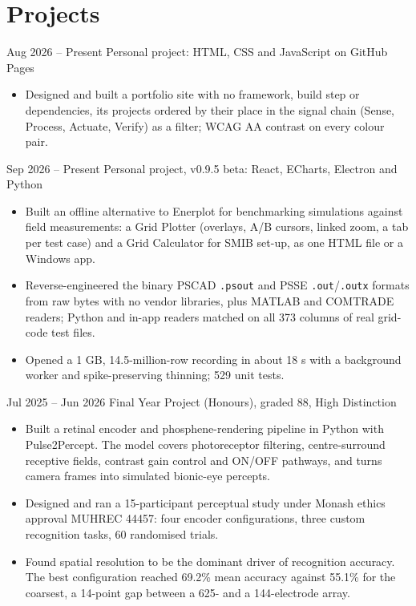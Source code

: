 \section*{Projects}

{Aug 2026 -- Present}
{Personal project: HTML, CSS and JavaScript on GitHub Pages}
{
\begin{itemize}
    \item Designed and built a portfolio site with no framework, build step or dependencies, its projects ordered by their place in the signal chain (Sense, Process, Actuate, Verify) as a filter; WCAG AA contrast on every colour pair.
\end{itemize}
}

{Sep 2026 -- Present}
{Personal project, v0.9.5 beta: React, ECharts, Electron and Python}
{
\begin{itemize}
    \item Built an offline alternative to Enerplot for benchmarking simulations against field measurements: a Grid Plotter (overlays, A/B cursors, linked zoom, a tab per test case) and a Grid Calculator for SMIB set-up, as one HTML file or a Windows app.
    \item Reverse-engineered the binary PSCAD \texttt{.psout} and PSS\textregistered{}E \texttt{.out}/\texttt{.outx} formats from raw bytes with no vendor libraries, plus MATLAB and COMTRADE readers; Python and in-app readers matched on all 373 columns of real grid-code test files.
    \item Opened a 1 GB, 14.5-million-row recording in about 18 s with a background worker and spike-preserving thinning; 529 unit tests.
\end{itemize}
}

{Jul 2025 -- Jun 2026}
{Final Year Project (Honours), graded 88, High Distinction}
{
\begin{itemize}
    \item Built a retinal encoder and phosphene-rendering pipeline in Python with Pulse2Percept. The model covers photoreceptor filtering, centre-surround receptive fields, contrast gain control and ON/OFF pathways, and turns camera frames into simulated bionic-eye percepts.
    \item Designed and ran a 15-participant perceptual study under Monash ethics approval MUHREC 44457: four encoder configurations, three custom recognition tasks, 60 randomised trials.
    \item Found spatial resolution to be the dominant driver of recognition accuracy. The best configuration reached 69.2\% mean accuracy against 55.1\% for the coarsest, a 14-point gap between a 625- and a 144-electrode array.
\end{itemize}
}


